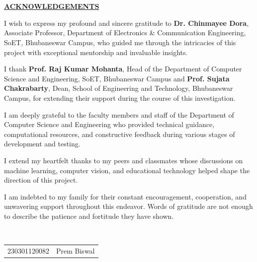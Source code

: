 \documentclass{article}
\begin{document}
\section*{}
\begin{center}
\underline{\LARGE \textbf{ACKNOWLEDGEMENTS}}\\[1.5cm]
\end{center}
\large{I wish to express my profound and sincere gratitude to \textbf{Dr. Chinmayee Dora}, Associate Professor, Department of Electronics \& Communication Engineering, SoET, Bhubaneswar Campus, who guided me through the intricacies of this project with exceptional mentorship and invaluable insights.\par

\vspace{0.3cm}

I thank \textbf{Prof. Raj Kumar Mohanta}, Head of the Department of Computer Science and Engineering, SoET, Bhubaneswar Campus and \textbf{Prof. Sujata Chakrabarty}, Dean, School of Engineering and Technology, Bhubaneswar Campus, for extending their support during the course of this investigation.\par

\vspace{0.3cm}

I am deeply grateful to the faculty members and staff of the Department of Computer Science and Engineering who provided technical guidance, computational resources, and constructive feedback during various stages of development and testing.\par

\vspace{0.3cm}

I extend my heartfelt thanks to my peers and classmates whose discussions on machine learning, computer vision, and educational technology helped shape the direction of this project.\par

\vspace{0.3cm}

I am indebted to my family for their constant encouragement, cooperation, and unwavering support throughout this endeavor. Words of gratitude are not enough to describe the patience and fortitude they have shown.}\\[0.5cm]

\begin{flushright}
\begin{table}[h]
\begin{tabular}{lr}
230301120082 & Prem Biswal\\
\end{tabular}
\end{table}
\end{flushright}
\end{document}
